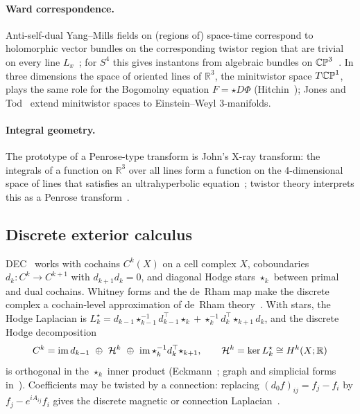 \documentclass[10pt]{article}
\theoremstyle{definition}
\newcommand{\R}{\mathbb R}\newcommand{\Z}{\mathbb Z}\newcommand{\C}{\mathbb C}
\begin{document}
\paragraph{Ward correspondence.} Anti-self-dual Yang--Mills fields on (regions of) space-time correspond to holomorphic vector bundles on the corresponding twistor region that are trivial on every line $L_x$~\cite{ward77}; for $S^4$ this gives instantons from algebraic bundles on $\mathbb{CP}^3$~\cite{atiyahward,ahs}. In three dimensions the space of oriented lines of $\R^3$, the minitwistor space $T\mathbb{CP}^1$, plays the same role for the Bogomolny equation $F=\star D\Phi$ (Hitchin~\cite{hitchin82}); Jones and Tod~\cite{jonestod} extend minitwistor spaces to Einstein--Weyl 3-manifolds.

\paragraph{Integral geometry.} The prototype of a Penrose-type transform is John's X-ray transform: the integrals of a function on $\R^3$ over all lines form a function on the 4-dimensional space of lines that satisfies an ultrahyperbolic equation~\cite{john38}; twistor theory interprets this as a Penrose transform~\cite{adm17,bastoneastwood}.

\subsection{Discrete exterior calculus}
DEC~\cite{hirani,dhlm} works with cochains $C^k(X)$ on a cell complex $X$, coboundaries $d_k:C^k\to C^{k+1}$ with $d_{k+1}d_k=0$, and diagonal Hodge stars $\star_k$ between primal and dual cochains. Whitney forms and the de~Rham map make the discrete complex a cochain-level approximation of de~Rham theory~\cite{whitney,dodziuk,afw}. With stars, the Hodge Laplacian is $L_k^\star=d_{k-1}\star_{k-1}^{-1}d_{k-1}^{\top}\star_k+\star_k^{-1}d_k^{\top}\star_{k+1}d_k$, and the discrete Hodge decomposition
\begin{equation}\label{e:hodge}
C^k=\im d_{k-1}\ \oplus\ \cH^k\ \oplus\ \im\star_k^{-1}d_k^{\top}\star_{k+1},\qquad \cH^k=\ker L_k^\star\cong H^k(X;\R)
\end{equation}
is orthogonal in the $\star_k$ inner product (Eckmann~\cite{eckmann}; graph and simplicial forms in~\cite{lim,schaub}). Coefficients may be twisted by a connection: replacing $(d_0f)_{ij}=f_j-f_i$ by $f_j-e^{iA_{ij}}f_i$ gives the discrete magnetic or connection Laplacian~\cite{shubin,kenyon,singerwu}.
\end{document}
